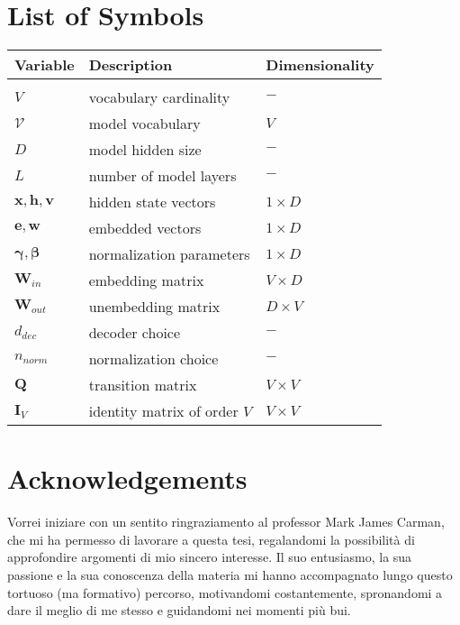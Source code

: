 \documentclass{Configuration_Files/PoliMi3i_thesis}
\newcommand{\gbm}[1]{\bm{\mathbf{#1}}} %
\begin{document}
\chapter*{List of Symbols} %
\begin{table}[H]
    \centering
    \begin{tabular}{lll}
        \textbf{Variable} & \textbf{Description} & \textbf{Dimensionality} \\
		\midrule \\[-9px]
		$V$ & vocabulary cardinality & $-$ \\[2px]
		$\mathcal{V}$ & model vocabulary & $V$ \\[2px]
		$D$ & model hidden size & $-$ \\[2px]
		$L$ & number of model layers & $-$ \\[2px]
		$\gbm{x}, \gbm{h}, \gbm{v}$ & hidden state vectors & $1 \times D$ \\[2px]
		$\gbm{e}, \gbm{w}$ & embedded vectors & $1 \times D$ \\[2px]
		$\gbm{\gamma}, \gbm{\beta}$ & normalization parameters & $1 \times D$ \\[2px]
		$\gbm{W}_{in}$ & embedding matrix & $V \times D$ \\[2px]
		$\gbm{W}_{out}$ & unembedding matrix & $D \times V$ \\[2px]
		$d_{dec}$ & decoder choice & $-$ \\[2px]
		$n_{norm}$ & normalization choice & $-$ \\[2px]
		$\gbm{Q}$ & transition matrix & $V \times V$ \\[2px]
		$\gbm{I}_V$ & identity matrix of order $V$ & $V \times V$ \\[2px]
    \end{tabular}
\end{table}

\chapter*{Acknowledgements}
Vorrei iniziare con un sentito ringraziamento al professor Mark James Carman, che mi ha permesso di lavorare a questa tesi, regalandomi la possibilità di approfondire argomenti di mio sincero interesse.
Il suo entusiasmo, la sua passione e la sua conoscenza della materia mi hanno accompagnato lungo questo tortuoso (ma formativo) percorso, motivandomi costantemente, spronandomi a dare il meglio di me stesso e guidandomi nei momenti più bui.
\end{document}

